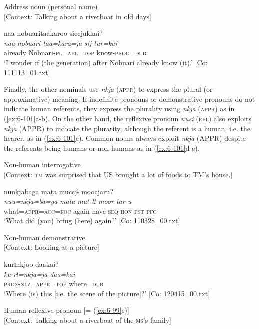 \ex Address noun (personal name)\\{}
[Context: Talking about a riverboat in old days]

{\TM}
\glll naa  nobuaritaakaroo  siccjukkai?\\
      \textit{naa}  \textit{nobuari-taa=kara=ja}  \textit{sij-tur=kai}\\
      already  Nobuari-\textsc{pl}=\textsc{abl}=\textsc{top}  know-\textsc{prog}=\textsc{dub}\\
\glt ‘I wonder if (the generation) after Nobuari already know (it).’ [Co: 111113\_01.txt]
\z
\z

  Finally, the other nominals use \textit{nkja} (\textsc{appr}) to express the plural (or approximative) meaning. If indefinite pronouns or demonstrative pronouns do not indicate human referents, they express the plurality using \textit{nkja} (\textsc{appr}) as in (\ref{ex:6-101}a-b). On the other hand, the reflexive pronoun \textit{nusi} (\textsc{rfl}) also exploits \textit{nkja} (APPR) to indicate the plurarity, although the referent is a human, i.e. the hearer, as in (\ref{ex:6-101}c). Common nouns always exploit \textit{nkja} (APPR) despite the referents being humans or non-humans as in (\ref{ex:6-101}d-e).

\ea\label{ex:6-101}
 \ea Non-human interrogative\\{}
[Context: \textsc{tm} was surprised that US brought a lot of foods to TM’s house.]

{\TM}
\glll nunkjabaga  mata  muccjɨ  moocjaru?\\
      \textit{nuu=nkja=ba=ga}  \textit{mata}  \textit{mut-tɨ}  \textit{moor-tar-u}\\
      what=\textsc{appr}=\textsc{acc}=\textsc{foc}  again  have-\textsc{seq}  \textsc{hon}-\textsc{pst}-\textsc{pfc}\\
\glt ‘What did (you) bring (here) again?’ [Co: 110328\_00.txt]

\ex Non-human demonstrative\\{}
[Context: Looking at a picture]

{\TM}
\glll kurɨnkjoo  daakai?\\
      \textit{ku-rɨ=nkja=ja}  \textit{daa=kai}\\
      \textsc{prox}-\textsc{nlz}=\textsc{appr}=\textsc{top}  where=\textsc{dub}\\
\glt ‘Where (is) this [i.e. the scene of the picture]?’ [Co: 120415\_00.txt]

\ex Human reflexive pronoun [= (\ref{ex:6-99}c)]\\{}
[Context: Talking about a riverboat of the \textsc{ms}’s family]

